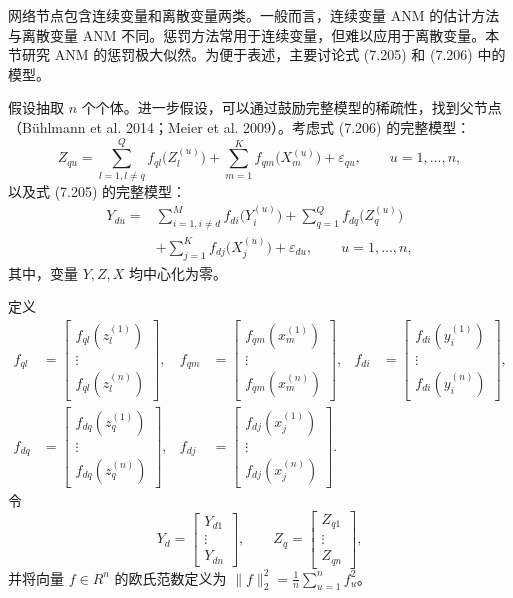 
网络节点包含连续变量和离散变量两类。一般而言，连续变量 ANM 的估计方法与离散变量 ANM 不同。惩罚方法常用于连续变量，但难以应用于离散变量。本节研究 ANM 的惩罚极大似然。为便于表述，主要讨论式 (7.205) 和 (7.206) 中的模型。

假设抽取 $n$ 个个体。进一步假设，可以通过鼓励完整模型的稀疏性，找到父节点（Bühlmann et al. 2014；Meier et al. 2009）。考虑式 (7.206) 的完整模型：
\begin{equation}
Z_{qu}=\sum_{l=1,l\ne q}^{Q}f_{ql}\bigl(Z_l^{(u)}\bigr)
+\sum_{m=1}^{K}f_{qm}\bigl(X_m^{(u)}\bigr)+\varepsilon_{qu},\qquad u=1,\ldots,n,
\tag{7.207}
\end{equation}
以及式 (7.205) 的完整模型：
\begin{equation}
\begin{aligned}
Y_{du}={}&\sum_{i=1,i\ne d}^{M}f_{di}\bigl(Y_i^{(u)}\bigr)
+\sum_{q=1}^{Q}f_{dq}\bigl(Z_q^{(u)}\bigr)\\
&+\sum_{j=1}^{K}f_{dj}\bigl(X_j^{(u)}\bigr)+\varepsilon_{du},\qquad u=1,\ldots,n,
\end{aligned}
\tag{7.208}
\end{equation}
其中，变量 $Y,Z,X$ 均中心化为零。

定义
\[
\begin{aligned}
f_{ql}&=\begin{bmatrix}f_{ql}(z_l^{(1)})\\\vdots\\f_{ql}(z_l^{(n)})\end{bmatrix},&
f_{qm}&=\begin{bmatrix}f_{qm}(x_m^{(1)})\\\vdots\\f_{qm}(x_m^{(n)})\end{bmatrix},&
f_{di}&=\begin{bmatrix}f_{di}(y_i^{(1)})\\\vdots\\f_{di}(y_i^{(n)})\end{bmatrix},\\
f_{dq}&=\begin{bmatrix}f_{dq}(z_q^{(1)})\\\vdots\\f_{dq}(z_q^{(n)})\end{bmatrix},&
f_{dj}&=\begin{bmatrix}f_{dj}(x_j^{(1)})\\\vdots\\f_{dj}(x_j^{(n)})\end{bmatrix}.&&
\end{aligned}
\]
令
\[
Y_d=\begin{bmatrix}Y_{d1}\\\vdots\\Y_{dn}\end{bmatrix},\qquad
Z_q=\begin{bmatrix}Z_{q1}\\\vdots\\Z_{qn}\end{bmatrix},
\]
并将向量 $f\in R^n$ 的欧氏范数定义为 $\|f\|_2^2=\frac1n\sum_{u=1}^nf_u^2$。

